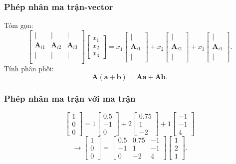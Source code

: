 \begin{frame}
    \frametitle{Phép nhân ma trận-vector}
    Tóm gọn:\[\begin{bmatrix}
    \vert &\vert&\vert\\
    \mathbf{A}_{i1}&\mathbf{A}_{i2}&\mathbf{A}_{i3}\\
    \vert &\vert&\vert\\
\end{bmatrix}\begin{bmatrix}
    x_1\\x_2\\x_3
\end{bmatrix}=x_1\begin{bmatrix}
    \vert\\\mathbf{A}_{i1}\\ \vert
\end{bmatrix}+x_2 \begin{bmatrix}
    \vert\\\mathbf{A}_{i2}\\ \vert
\end{bmatrix}+x_3\begin{bmatrix}
    \vert\\\mathbf{A}_{i1}\\ \vert
\end{bmatrix}.\]
Tính phân phối: \[\mathbf{A}(\mathbf{a}+\mathbf{b})=\mathbf{A}\mathbf{a}+\mathbf{A}\mathbf{b}.\]
\end{frame}
\begin{frame}
    \frametitle{Phép nhân ma trận với ma trận}
    \[
    \begin{bmatrix}
    1\\0\\0
    \end{bmatrix}=1\begin{bmatrix}
    0.5 \\-1\\0
    \end{bmatrix}+2\begin{bmatrix}
    0.75 \\1\\-2
    \end{bmatrix}+1\begin{bmatrix}
    -1 \\-1\\4
    \end{bmatrix}\]\[\rightarrow \begin{bmatrix}
        1\\0\\0
    \end{bmatrix}=\begin{bmatrix}
        0.5 & 0.75 & -1\\
        -1 & 1 & -1\\
        0 & -2 & 4
    \end{bmatrix}\begin{bmatrix} 1\\2\\1\end{bmatrix}.
    \]
\end{frame}
